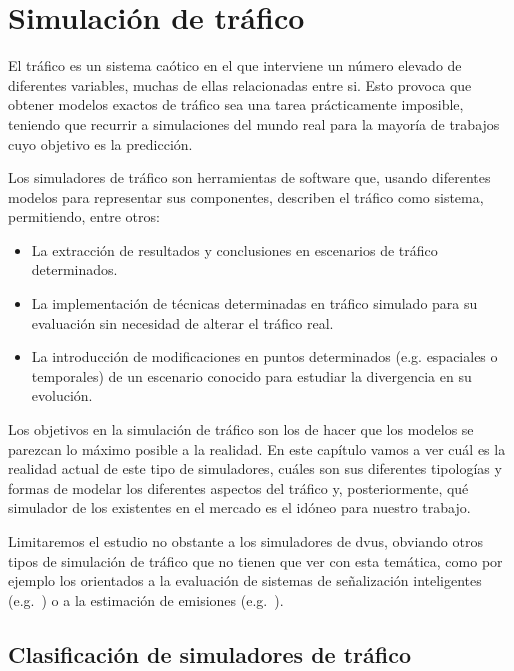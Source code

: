 \chapter{Simulación de tráfico}
\label{ch:sota-traffic-simulation}

El tráfico es un sistema caótico en el que interviene un número elevado de diferentes variables, muchas de ellas relacionadas entre si. Esto provoca que obtener modelos exactos de tráfico sea una tarea prácticamente imposible, teniendo que recurrir a simulaciones del mundo real para la mayoría de trabajos cuyo objetivo es la predicción.

Los simuladores de tráfico son herramientas de software que, usando diferentes modelos para representar sus componentes, describen el tráfico como sistema, permitiendo, entre otros:

\begin{itemize}
	\item La extracción de resultados y conclusiones en escenarios de tráfico determinados.
	\item La implementación de técnicas determinadas en tráfico simulado para su evaluación sin necesidad de alterar el tráfico real.
	\item La introducción de modificaciones en puntos determinados (e.g. espaciales o temporales) de un escenario conocido para estudiar la divergencia en su evolución.
\end{itemize}

Los objetivos en la simulación de tráfico son los de hacer que los modelos se parezcan lo máximo posible a la realidad. En este capítulo vamos a ver cuál es la realidad actual de este tipo de simuladores, cuáles son sus diferentes tipologías y formas de modelar los diferentes aspectos del tráfico y, posteriormente, qué simulador de los existentes en el mercado es el idóneo para nuestro trabajo.

Limitaremos el estudio no obstante a los simuladores de \acp{dvu}, obviando otros tipos de simulación de tráfico que no tienen que ver con esta temática, como por ejemplo los orientados a la evaluación de sistemas de señalización inteligentes (e.g.~\cite{jin2016evaluation}) o a la estimación de emisiones (e.g.~\cite{quaassdorff2016microscale}).

\section{Clasificación de simuladores de tráfico}

